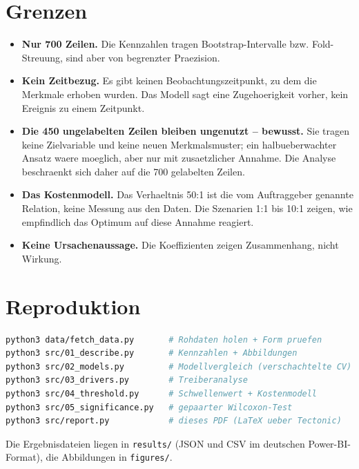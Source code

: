 \section{Grenzen}

\begin{itemize}
  \item \textbf{Nur 700 Zeilen.} Die Kennzahlen tragen Bootstrap-Intervalle
        bzw. Fold-Streuung, sind aber von begrenzter Praezision.
  \item \textbf{Kein Zeitbezug.} Es gibt keinen Beobachtungszeitpunkt, zu
        dem die Merkmale erhoben wurden. Das Modell sagt eine Zugehoerigkeit
        vorher, kein Ereignis zu einem Zeitpunkt.
  \item \textbf{Die 450 ungelabelten Zeilen bleiben ungenutzt -- bewusst.}
        Sie tragen keine Zielvariable und keine neuen Merkmalsmuster; ein
        halbueberwachter Ansatz waere moeglich, aber nur mit zusaetzlicher
        Annahme. Die Analyse beschraenkt sich daher auf die 700 gelabelten
        Zeilen.
  \item \textbf{Das Kostenmodell.} Das Verhaeltnis 50:1 ist die vom
        Auftraggeber genannte Relation, keine Messung aus den Daten. Die
        Szenarien 1:1 bis 10:1 zeigen, wie empfindlich das Optimum auf diese
        Annahme reagiert.
  \item \textbf{Keine Ursachenaussage.} Die Koeffizienten zeigen
        Zusammenhang, nicht Wirkung.
\end{itemize}

\section{Reproduktion}

\begin{lstlisting}[language=bash]
python3 data/fetch_data.py       # Rohdaten holen + Form pruefen
python3 src/01_describe.py       # Kennzahlen + Abbildungen
python3 src/02_models.py         # Modellvergleich (verschachtelte CV)
python3 src/03_drivers.py        # Treiberanalyse
python3 src/04_threshold.py      # Schwellenwert + Kostenmodell
python3 src/05_significance.py   # gepaarter Wilcoxon-Test
python3 src/report.py            # dieses PDF (LaTeX ueber Tectonic)
\end{lstlisting}

Die Ergebnisdateien liegen in \texttt{results/} (JSON und CSV im deutschen
Power-BI-Format), die Abbildungen in \texttt{figures/}.
